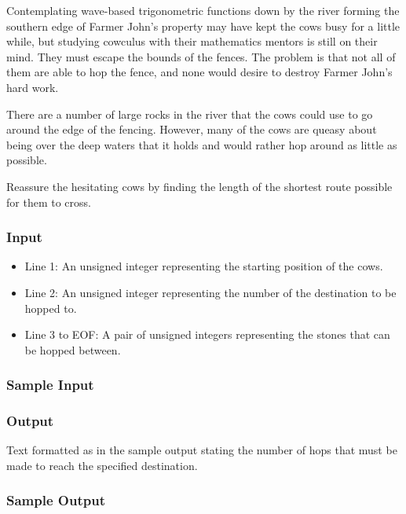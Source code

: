Contemplating wave-based trigonometric functions down by the river forming the southern edge of Farmer John's property may have kept the cows busy for a little while, but studying cowculus with their mathematics mentors is still on their mind.
They must escape the bounds of the fences.
The problem is that not all of them are able to hop the fence, and none would desire to destroy Farmer John's hard work.

There are a number of large rocks in the river that the cows could use to go around the edge of the fencing.
However, many of the cows are queasy about being over the deep waters that it holds and would rather hop around as little as possible.

Reassure the hesitating cows by finding the length of the shortest route possible for them to cross.

\subsubsection{Input}
\begin{itemize}
	\item Line 1: An unsigned integer representing the starting position of the cows.
	\item Line 2: An unsigned integer representing the number of the destination to be hopped to.
	\item Line 3 to EOF: A pair of unsigned integers representing the stones that can be hopped between.
\end{itemize}

\subsubsection{Sample Input}

\subsubsection{Output}
Text formatted as in the sample output stating the number of hops that must be made to reach the specified destination.

\subsubsection{Sample Output}

